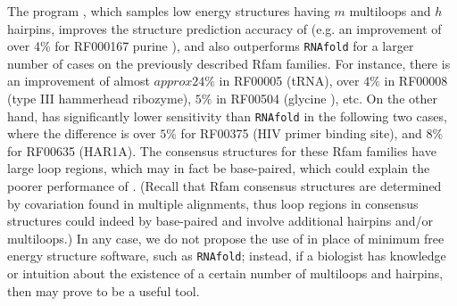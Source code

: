 The program {\rnahairpinml}, which samples low energy structures having
$m$ multiloops and $h$ hairpins,  improves the structure prediction
accuracy of {\rnahairpin} (e.g. an improvement of over 4\% for RF000167
purine \rbs), and also outperforms {\tt RNAfold} for a larger number
of cases on the previously described Rfam families. For instance,
there is an improvement
of almost $approx 24\%$ in RF00005 (tRNA),
over $4\%$ in RF00008 (type III hammerhead ribozyme),
$5\%$ in RF00504  (glycine \rb), etc.
On the other hand, {\rnahairpinml} has significantly lower
sensitivity than {\tt RNAfold} in the following two cases, where
the difference is over $5\%$ for RF00375 (HIV primer binding site),
and $8\%$ for RF00635 (HAR1A). The consensus structures for these
Rfam families have large loop regions, which may in fact be base-paired,
which could explain the poorer performance of {\rnahairpinml}.
(Recall that Rfam consensus structures are determined by covariation found
in multiple alignments, thus loop regions in consensus structures could
indeed by base-paired and involve additional hairpins and/or multiloops.)
In any case, we do not propose the use of {\rnahairpinml} in place of
minimum free energy structure software, such as {\tt RNAfold}; instead,
if a biologist has knowledge or intuition about the existence of a certain
number of multiloops and hairpins, then {\rnahairpinml} may prove to be a
useful tool.

